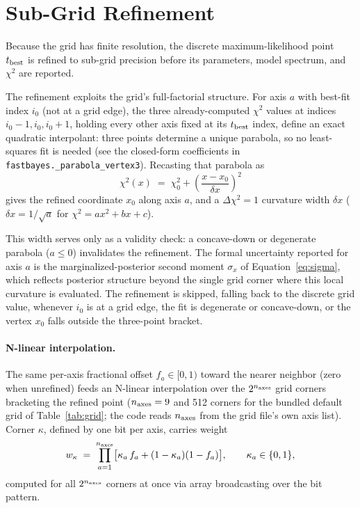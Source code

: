 \documentclass[12pt]{article}
\newcommand{\chisq}{\chi^2}
\begin{document}
\section{Sub-Grid Refinement}
\label{sec:refine}

Because the grid has finite resolution, the discrete maximum-likelihood
point $t_{\rm best}$ is refined to sub-grid precision before its
parameters, model spectrum, and $\chisq$ are reported.

The refinement exploits the grid's full-factorial structure. For axis $a$
with best-fit index $i_0$ (not at a grid edge), the three already-computed
$\chisq$ values at indices $i_0-1, i_0, i_0+1$, holding every other axis
fixed at its $t_{\rm best}$ index, define an exact quadratic interpolant:
three points determine a unique parabola, so no least-squares fit is
needed (see the closed-form coefficients in
\texttt{fastbayes.\_parabola\_vertex3}). Recasting that parabola as
\begin{equation}
  \chisq(x) \;=\; \chisq_0 + \left(\frac{x - x_0}{\delta x}\right)^2
  \label{eq:parabola}
\end{equation}
gives the refined coordinate $x_0$ along axis $a$, and a $\Delta\chisq=1$
curvature width $\delta x$ ($\delta x = 1/\sqrt{a}$ for $\chisq = a x^2 +
bx + c$).

This width serves only as a validity check: a concave-down or degenerate
parabola ($a \le 0$) invalidates the refinement. The formal uncertainty
reported for axis $a$ is the marginalized-posterior second moment
$\sigma_x$ of Equation~\ref{eq:sigma}, which reflects posterior structure
beyond the single grid corner where this local curvature is evaluated.
The refinement is skipped, falling back to the discrete grid value,
whenever $i_0$ is at a grid edge, the fit is degenerate or concave-down,
or the vertex $x_0$ falls outside the three-point bracket.

\paragraph{N-linear interpolation.} The same per-axis fractional offset
$f_a \in [0,1)$ toward the nearer neighbor (zero when unrefined) feeds an
N-linear interpolation over the $2^{n_{\rm axes}}$ grid corners
bracketing the refined point ($n_{\rm axes}=9$ and 512 corners for the
bundled default grid of Table~\ref{tab:grid}; the code reads
$n_{\rm axes}$ from the grid file's own axis list). Corner $\kappa$,
defined by one bit per axis, carries weight
\begin{equation}
  w_\kappa \;=\; \prod_{a=1}^{n_{\rm axes}} \bigl[\kappa_a\, f_a + (1-\kappa_a)(1-f_a)\bigr],
  \qquad \kappa_a \in \{0, 1\},
  \label{eq:corner_weight}
\end{equation}
computed for all $2^{n_{\rm axes}}$ corners at once via array broadcasting
over the bit pattern.
\end{document}
